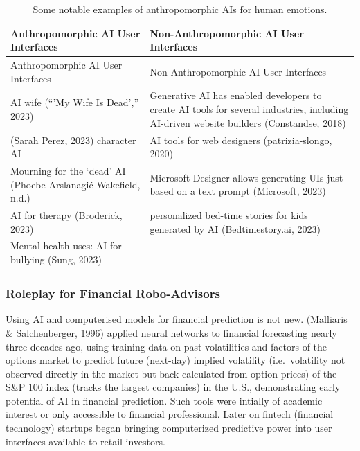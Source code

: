 \documentclass[
  12pt,
  letterpaper,
  DIV=11,
  numbers=noendperiod]{scrartcl}
\begin{document}
\begin{longtable}[]{@{}
  >{\raggedright\arraybackslash}p{}
  >{\raggedright\arraybackslash}p{}@{}}
\caption[Anthropomorphic AIs for Human Emotions]{Some notable examples
of anthropomorphic AIs for human emotions.}\tabularnewline
\toprule\noalign{}
\begin{minipage}[b]{\linewidth}\raggedright
Anthropomorphic AI User Interfaces
\end{minipage} & \begin{minipage}[b]{\linewidth}\raggedright
Non-Anthropomorphic AI User Interfaces
\end{minipage} \\
\midrule\noalign{}
\endfirsthead
\toprule\noalign{}
\begin{minipage}[b]{\linewidth}\raggedright
Anthropomorphic AI User Interfaces
\end{minipage} & \begin{minipage}[b]{\linewidth}\raggedright
Non-Anthropomorphic AI User Interfaces
\end{minipage} \\
\midrule\noalign{}
\endhead
\bottomrule\noalign{}
\endlastfoot
AI wife ({``'{My} Wife Is Dead',''} 2023) & Generative AI has enabled
developers to create AI tools for several industries, including
AI-driven website builders (Constandse, 2018) \\
(Sarah Perez, 2023) character AI & AI tools for web designers
(patrizia-slongo, 2020) \\
Mourning for the `dead' AI (Phoebe Arslanagić-Wakefield, n.d.) &
Microsoft Designer allows generating UIs just based on a text prompt
(Microsoft, 2023) \\
AI for therapy (Broderick, 2023) & personalized bed-time stories for
kids generated by AI (Bedtimestory.ai, 2023) \\
Mental health uses: AI for bullying (Sung, 2023) & \\
\end{longtable}

\let\pandoctableshortcapt\relax

\subsubsection{Roleplay for Financial
Robo-Advisors}\label{roleplay-for-financial-robo-advisors}

Using AI and computerised models for financial prediction is not new.
(Malliaris \& Salchenberger, 1996) applied neural networks to financial
forecasting nearly three decades ago, using training data on past
volatilities and factors of the options market to predict future
(next-day) implied volatility (i.e.~volatility not observed directly in
the market but back-calculated from option prices) of the S\&P 100 index
(tracks the largest companies) in the U.S., demonstrating early
potential of AI in financial prediction. Such tools were intially of
academic interest or only accessible to financial professional. Later on
fintech (financial technology) startups began bringing computerized
predictive power into user interfaces available to retail investors.
\end{document}
